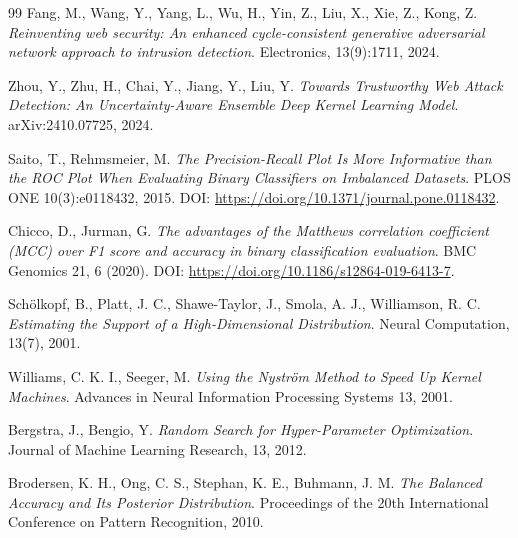 \documentclass[12pt,oneside]{report}
\begin{document}
\begin{thebibliography}{99}
Fang, M., Wang, Y., Yang, L., Wu, H., Yin, Z., Liu, X., Xie, Z., Kong, Z.
\emph{Reinventing web security: An enhanced cycle-consistent generative adversarial network approach to intrusion detection}.
Electronics, 13(9):1711, 2024.

Zhou, Y., Zhu, H., Chai, Y., Jiang, Y., Liu, Y.
\emph{Towards Trustworthy Web Attack Detection: An Uncertainty-Aware Ensemble Deep Kernel Learning Model}.
arXiv:2410.07725, 2024.

Saito, T., Rehmsmeier, M.
\emph{The Precision-Recall Plot Is More Informative than the ROC Plot When Evaluating Binary Classifiers on Imbalanced Datasets}.
PLOS ONE 10(3):e0118432, 2015. DOI: \url{https://doi.org/10.1371/journal.pone.0118432}.

Chicco, D., Jurman, G.
\emph{The advantages of the Matthews correlation coefficient (MCC) over F1 score and accuracy in binary classification evaluation}.
BMC Genomics 21, 6 (2020). DOI: \url{https://doi.org/10.1186/s12864-019-6413-7}.



Schölkopf, B., Platt, J. C., Shawe-Taylor, J., Smola, A. J., Williamson, R. C.
\emph{Estimating the Support of a High-Dimensional Distribution}.
Neural Computation, 13(7), 2001.

Williams, C. K. I., Seeger, M.
\emph{Using the Nyström Method to Speed Up Kernel Machines}.
Advances in Neural Information Processing Systems 13, 2001.

Bergstra, J., Bengio, Y.
\emph{Random Search for Hyper-Parameter Optimization}.
Journal of Machine Learning Research, 13, 2012.

Brodersen, K. H., Ong, C. S., Stephan, K. E., Buhmann, J. M.
\emph{The Balanced Accuracy and Its Posterior Distribution}.
Proceedings of the 20th International Conference on Pattern Recognition, 2010.

\end{thebibliography}
\end{document}
